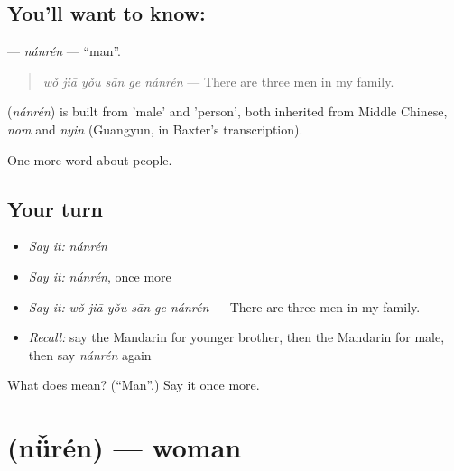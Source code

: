 \subsection*{You'll want to know: }
\textbf{} — \emph{nánrén} — \textquotedblleft{}man\textquotedblright{}.

\begin{quote}
\textbf{} \emph{wǒ jiā yǒu sān ge nánrén} — There are three men in my family.
\end{quote}

\begin{cousinweb}
\textbf{} (\emph{nánrén}) is built from  'male' and  'person', both inherited from Middle Chinese, \emph{nom} and \emph{nyin} (Guangyun, in Baxter's transcription).
\end{cousinweb}

\begin{grammarlens}[title={What you've built}]
One more word about people.
\end{grammarlens}

\subsection*{Your turn}
\begin{itemize}
\raggedright
  \item \emph{Say it:} \emph{nánrén}
  \item \emph{Say it:} \emph{nánrén}, once more
  \item \emph{Say it:} \emph{wǒ jiā yǒu sān ge nánrén} — There are three men in my family.
  \item \emph{Recall:} say the Mandarin for younger brother, then the Mandarin for male, then say \emph{nánrén} again
\end{itemize}

\begin{tcolorbox}[breakable,colback=teal!4,colframe=teal!35!black,title={Before you move on}]
What does  mean? (\textquotedblleft{}Man\textquotedblright{}.) Say it once more.
\end{tcolorbox}
\section[\texorpdfstring{\zh{女人} (nǚrén)}{女人 (nǚrén)}]{ (nǚrén) — woman}

\label{lesson:ZH-C33-nuren}



